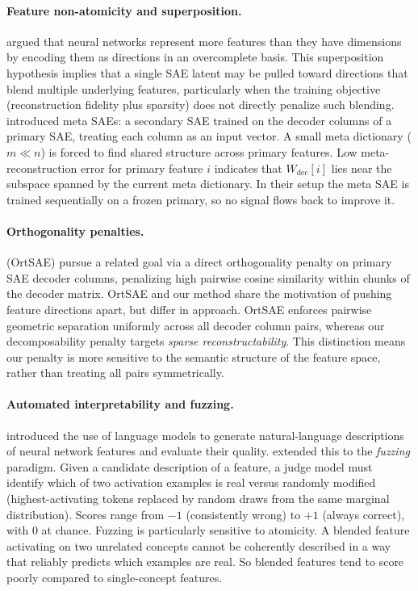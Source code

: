 \documentclass{article} %
\begin{document}
\paragraph{Feature non-atomicity and superposition.}
\citet{elhage2022superposition} argued that neural networks represent more features
than they have dimensions by encoding them as directions in an overcomplete basis.
This superposition hypothesis implies that a single SAE latent may be pulled toward
directions that blend multiple underlying features, particularly when the training
objective (reconstruction fidelity plus sparsity) does not directly penalize such
blending.
\citet{bussmann2024metasaes} introduced meta SAEs: a secondary SAE trained on
the decoder columns of a primary SAE, treating each column as an input vector.
A small meta dictionary ($m \ll n$) is forced to find shared structure across
primary features. Low meta-reconstruction error for primary feature $i$ indicates
that $W_\text{dec}[i]$ lies near the subspace spanned by the current meta dictionary.
In their setup the meta SAE is trained sequentially on a frozen primary, so no
signal flows back to improve it.

\paragraph{Orthogonality penalties.}
\citet{korznikov2025ortsae} (OrtSAE) pursue a related goal via a direct
orthogonality penalty on primary SAE decoder columns, penalizing high pairwise
cosine similarity within chunks of the decoder matrix.
OrtSAE and our method share the motivation of pushing feature directions apart,
but differ in approach. OrtSAE enforces pairwise geometric separation
uniformly across all decoder column pairs, whereas our decomposability penalty
targets \emph{sparse reconstructability}.
This distinction means our penalty is more sensitive to the semantic structure of the
feature space, rather than treating all pairs symmetrically.

\paragraph{Automated interpretability and fuzzing.}
\citet{bills2023language} introduced the use of language models to generate
natural-language descriptions of neural network features and evaluate their
quality.
\citet{paulo2024autointerp} extended this to the \emph{fuzzing}
paradigm. Given a candidate description of a feature, a judge model must identify
which of two activation examples is real versus randomly modified (highest-activating
tokens replaced by random draws from the same marginal distribution).
Scores range from $-1$ (consistently wrong) to $+1$ (always correct), with $0$
at chance.
Fuzzing is particularly sensitive to atomicity. A blended feature activating on
two unrelated concepts cannot be coherently described in a way that reliably
predicts which examples are real. So blended features tend to score poorly
compared to single-concept features.
\end{document}
